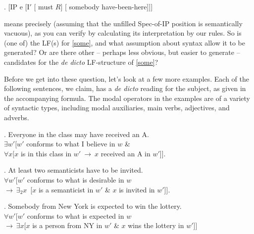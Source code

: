\ex. [IP e [I$'$ [ must $R$] [ somebody have-been-here]]]

\Last means precisely \LLast (assuming that the unfilled Spec-of-IP position is semantically vacuous), as you can verify by calculating its interpretation by our rules. So is \Last (one of) the LF(s) for \ref{some}, and what assumption about syntax allow it to be generated? Or are there other -- perhaps less obvious, but easier to generate -- candidates for the \emph{de dicto} LF-structure of \ref{some}?

Before we get into these question, let's look at a few more examples. Each of the following sentences, we claim, has a \emph{de dicto} reading for the subject, as given in the accompanying formula. The modal operators in the examples are of a variety of syntactic types, including modal auxiliaries, main verbs, adjectives, and adverbs.

\ex. \label{everymay} Everyone in the class may have received an A.\\
$\exists w'[w'$ conforms to what I believe in $w$ \&\\
\null\hfill$\forall x[x$ is in this class in $w'\ \rightarrow\ x$ received an A in $w'$]].

\ex. At least two semanticists have to be invited.\\
$\forall w'[w'$ conforms to what is desirable in $w$\\
\null\hfill$ \rightarrow\ \exists_2 x$\ [$x$ is a semanticist in $w'$ \& $x$ is invited in $w'$]].

\ex. \label{ny} Somebody from New York is expected to win the lottery.\\
$\forall w'[w'$ conforms to what is expected in $w$\\
\null\hfill$ \rightarrow\ \exists x[x$ is a person from NY in $w'$ \& $x$ wins the lottery in $w'$]]

